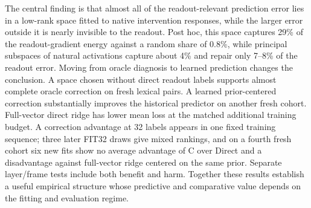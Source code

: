 \documentclass[11pt]{article}
\begin{document}
The central finding is that almost all of the readout-relevant prediction error lies in a low-rank space fitted to native intervention responses, while the larger error outside it is nearly invisible to the readout. Post hoc, this space captures 29\% of the readout-gradient energy against a random share of 0.8\%, while principal subspaces of natural activations capture about 4\% and repair only 7--8\% of the readout error. Moving from oracle diagnosis to learned prediction changes the conclusion. A space chosen without direct readout labels supports almost complete oracle correction on fresh lexical pairs. A learned prior-centered correction substantially improves the historical predictor on another fresh cohort. Full-vector direct ridge has lower mean loss at the matched additional training budget. A correction advantage at 32 labels appears in one fixed training sequence; three later FIT32 draws give mixed rankings, and on a fourth fresh cohort six new fits show no average advantage of C over Direct and a disadvantage against full-vector ridge centered on the same prior. Separate layer/frame tests include both benefit and harm. Together these results establish a useful empirical structure whose predictive and comparative value depends on the fitting and evaluation regime.
\end{document}
